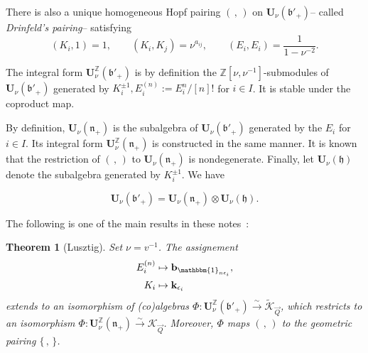 \documentclass[a4paper,10pt]{amsart}
\def\Z{\mathbb{Z}}
\def\U{\mathbf{U}}
\def\bo{\mathfrak{b}}
\def\n{\mathfrak{n}}
\def\v{\nu}
\newtheorem{theo}{\bf{Theorem}}[section]
\numberwithin{equation}{section}
\begin{document}
There is also a unique homogeneous Hopf pairing $(\,,\,)$ on $\U_{\v}(\bo'_+)$-- called \textit{Drinfeld's pairing}-- satisfying
\begin{equation}\label{E:Drinpairing}
(K_i,1)=1, \qquad (K_i,K_j)=\v^{a_{ij}}, \qquad (E_i,E_i)=\frac{1}{1-\v^{-2}}.
\end{equation}

\vspace{.1in}

The integral form $\U^{\Z}_{\v}(\bo'_+)$ is by definition the $\Z[\v,\v^{-1}]$-submodules of $\U_{\v}(\bo'_+)$ generated by $K_i^{\pm 1}, E_i^{(n)}:=E_i^n/[n]!$ for $i \in I$. It is stable under the coproduct map.

\vspace{.1in}

By definition, $\U_{\v}(\n_+)$ is the subalgebra of $\U_{\v}(\bo'_+)$ generated by the $E_i$ for $i \in I$. Its integral form $\U^{\Z}_{\v}(\n_+)$ is constructed in the same manner. It is known that the restriction of $(\,,\,)$ to $\U_{\v}(\n_+)$ is nondegenerate. Finally, let $\U_{\nu}(\mathfrak{h})$ denote the subalgebra generated by $K_i^{\pm 1}$. We have

\begin{equation}\label{E:trigdec}
\U_{\nu}(\bo'_+) = \U_{\nu}(\n_+) \otimes \U_{\nu}(\mathfrak{h}).
\end{equation}

\vspace{.15in}

The following is one of the main results in these notes~:

\vspace{.1in}

\begin{theo}[Lusztig]\label{T:LU} Set $\nu=v^{-1}$. The assignement 
\begin{equation}\label{E:Lustrel}
\begin{split}
E_i^{(n)} &\mapsto \mathbf{b}_{\mathbbm{1}_{n\epsilon_i}},\\
K_i &\mapsto \mathbf{k}_{\epsilon_i}
\end{split}
\end{equation}
extends to an isomorphism of (co)algebras $\Phi: \U_{\v}^{\Z}(\bo'_+) \stackrel{\sim}{\to} \widetilde{\mathcal{K}}_{\vec{Q}}$, which restricts to an isomorphism $\Phi: \U_{\v}^{\Z}(\n_+) \stackrel{\sim}{\to} {\mathcal{K}}_{\vec{Q}}$. Moreover, $\Phi$ maps $(\,,\,)$ to the geometric pairing $\{\,,\,\}$.
\end{theo}
\end{document}
